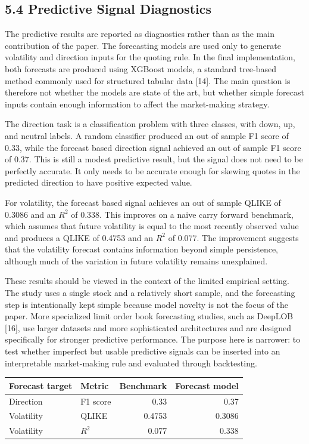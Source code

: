 \documentclass[12pt,a4paper]{article}
\begin{document}
\subsection{5.4 Predictive Signal
Diagnostics}\label{predictive-signal-diagnostics}

The predictive results are reported as diagnostics rather than as the
main contribution of the paper. The forecasting models are used only to
generate volatility and direction inputs for the quoting rule. In the
final implementation, both forecasts are produced using XGBoost models,
a standard tree-based method commonly used for structured tabular data
{[}14{]}. The main question is therefore not whether the models are
state of the art, but whether simple forecast inputs contain enough
information to affect the market-making strategy.

The direction task is a classification problem with three classes, with
down, up, and neutral labels. A random classifier produced an out of
sample F1 score of 0.33, while the forecast based direction signal
achieved an out of sample F1 score of 0.37. This is still a modest
predictive result, but the signal does not need to be perfectly
accurate. It only needs to be accurate enough for skewing quotes in the
predicted direction to have positive expected value.

For volatility, the forecast based signal achieves an out of sample
QLIKE of 0.3086 and an \(R^2\) of 0.338. This improves on a naive carry
forward benchmark, which assumes that future volatility is equal to the
most recently observed value and produces a QLIKE of 0.4753 and an
\(R^2\) of 0.077. The improvement suggests that the volatility forecast
contains information beyond simple persistence, although much of the
variation in future volatility remains unexplained.

These results should be viewed in the context of the limited empirical
setting. The study uses a single stock and a relatively short sample,
and the forecasting step is intentionally kept simple because model
novelty is not the focus of the paper. More specialized limit order book
forecasting studies, such as DeepLOB {[}16{]}, use larger datasets and
more sophisticated architectures and are designed specifically for
stronger predictive performance. The purpose here is narrower: to test
whether imperfect but usable predictive signals can be inserted into an
interpretable market-making rule and evaluated through backtesting.

\begingroup\small{}\setlength{\tabcolsep}{4pt}
\begin{longtable}[]{@{}llrr@{}}
\toprule\noalign{}
Forecast target & Metric & Benchmark & Forecast model \\
\midrule\noalign{}
\endhead
\bottomrule\noalign{}
\endlastfoot
Direction & F1 score & 0.33 & 0.37 \\
Volatility & QLIKE & 0.4753 & 0.3086 \\
Volatility & \(R^2\) & 0.077 & 0.338 \\
\end{longtable}
\endgroup
\end{document}
